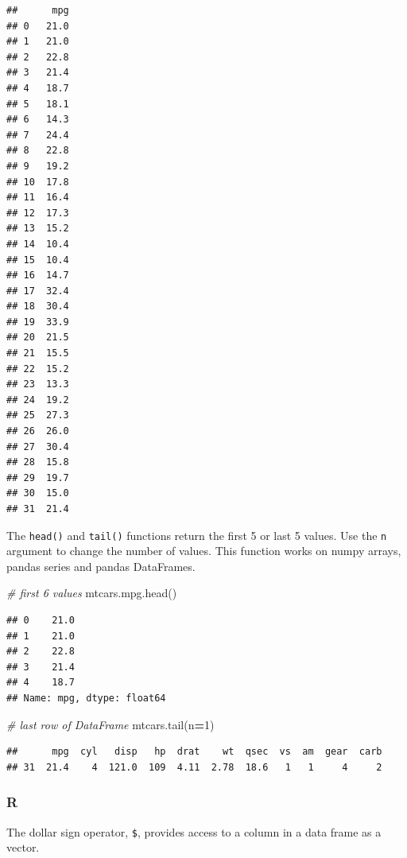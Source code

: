 \documentclass[
]{book}
\newenvironment{Shaded}{\begin{snugshade}}{\end{snugshade}}
\newcommand{\CommentTok}[1]{\textcolor[rgb]{0.56,0.35,0.01}{\textit{#1}}}
\newcommand{\DecValTok}[1]{\textcolor[rgb]{0.00,0.00,0.81}{#1}}
\newcommand{\NormalTok}[1]{#1}
\newcommand{\OperatorTok}[1]{\textcolor[rgb]{0.81,0.36,0.00}{\textbf{#1}}}
\newcommand{\SpecialCharTok}[1]{\textcolor[rgb]{0.00,0.00,0.00}{#1}}
\begin{document}
\begin{verbatim}
##      mpg
## 0   21.0
## 1   21.0
## 2   22.8
## 3   21.4
## 4   18.7
## 5   18.1
## 6   14.3
## 7   24.4
## 8   22.8
## 9   19.2
## 10  17.8
## 11  16.4
## 12  17.3
## 13  15.2
## 14  10.4
## 15  10.4
## 16  14.7
## 17  32.4
## 18  30.4
## 19  33.9
## 20  21.5
## 21  15.5
## 22  15.2
## 23  13.3
## 24  19.2
## 25  27.3
## 26  26.0
## 27  30.4
## 28  15.8
## 29  19.7
## 30  15.0
## 31  21.4
\end{verbatim}

The \texttt{head()} and \texttt{tail()} functions return the first 5 or last 5 values. Use the \texttt{n} argument to change the number of values. This function works on numpy arrays, pandas series and pandas DataFrames.

\begin{Shaded}
\begin{Highlighting}[]
\CommentTok{\# first 6 values}
\NormalTok{mtcars.mpg.head()}
\end{Highlighting}
\end{Shaded}

\begin{verbatim}
## 0    21.0
## 1    21.0
## 2    22.8
## 3    21.4
## 4    18.7
## Name: mpg, dtype: float64
\end{verbatim}

\begin{Shaded}
\begin{Highlighting}[]
\CommentTok{\# last row of DataFrame}
\NormalTok{mtcars.tail(n}\OperatorTok{=}\DecValTok{1}\NormalTok{)}
\end{Highlighting}
\end{Shaded}

\begin{verbatim}
##      mpg  cyl   disp   hp  drat    wt  qsec  vs  am  gear  carb
## 31  21.4    4  121.0  109  4.11  2.78  18.6   1   1     4     2
\end{verbatim}

\hypertarget{r-18}{%
\subsubsection*{R}\label{r-18}}

The dollar sign operator, \texttt{\$}, provides access to a column in a data frame as a vector.

\begin{Shaded}
\end{Shaded}
\end{document}

